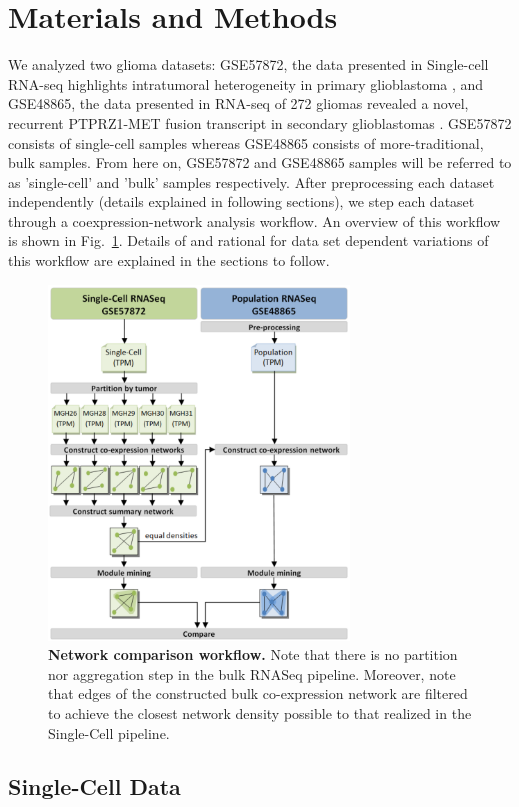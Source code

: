 \documentclass[10pt,letterpaper]{article}
\begin{document}
\section*{Materials and Methods}
We analyzed two glioma datasets: GSE57872, the data presented in Single-cell RNA-seq highlights intratumoral heterogeneity in primary glioblastoma \cite{Patel20062014}, and GSE48865, the data presented in RNA-seq of 272 gliomas revealed a novel, recurrent PTPRZ1-MET fusion transcript in secondary glioblastomas \cite{Bao2014}. GSE57872 consists of single-cell samples whereas GSE48865 consists of more-traditional, bulk samples. From here on, GSE57872 and GSE48865 samples will be referred to as 'single-cell' and 'bulk' samples respectively. After preprocessing each dataset independently (details explained in following sections), we step each dataset through a coexpression-network analysis workflow. An overview of this workflow is shown in Fig.~\ref{fig:workflow}. Details of and rational for data set dependent variations of this workflow are explained in the sections to follow.

\begin{figure}[h]
\centering
\includegraphics[width=80mm]{Figures/Workflow}
\caption{{\bf Network comparison workflow.} Note that there is no  partition nor aggregation step in the bulk RNASeq pipeline. Moreover, note that edges of the constructed bulk co-expression network are filtered to achieve the closest network density possible to that realized in the Single-Cell pipeline. }
\label{fig:workflow}
\end{figure}

\subsection*{Single-Cell Data}
\end{document}
